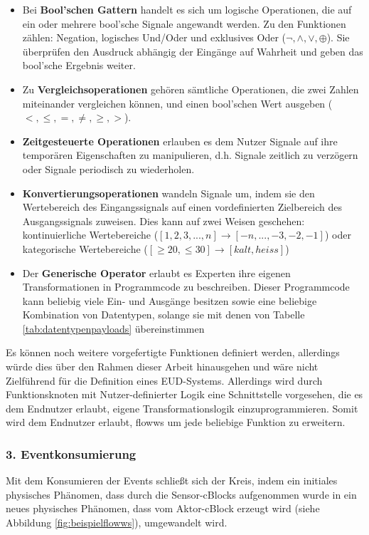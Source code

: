 \begin{itemize} 
     \item Bei \textbf{Bool'schen Gattern} handelt es sich um logische Operationen, die auf ein oder mehrere bool'sche Signale angewandt werden. Zu den Funktionen zählen: Negation, logisches Und/Oder und exklusives Oder ($\neg, \land, \lor, \oplus$). Sie überprüfen den Ausdruck abhängig der Eingänge auf Wahrheit und geben das bool'sche Ergebnis weiter.
     \item Zu \textbf{Vergleichsoperationen} gehören sämtliche Operationen, die zwei Zahlen miteinander vergleichen können, und einen bool'schen Wert ausgeben ($<,\leq,=,\neq,\geq,>$).
     \item \textbf{Zeitgesteuerte Operationen} erlauben es dem Nutzer Signale auf ihre temporären Eigenschaften zu manipulieren, d.h. Signale zeitlich zu verzögern oder Signale periodisch zu wiederholen.
     \item \textbf{Konvertierungsoperationen} wandeln Signale um, indem sie den Wertebereich des Eingangssignals auf einen vordefinierten Zielbereich des Ausgangssignals zuweisen. Dies kann auf zwei Weisen geschehen: kontinuierliche Wertebereiche ($\left [ 1,2,3,...,n \right ] \rightarrow \left [ -n,...,-3,-2,-1 \right ]$) oder kategorische Wertebereiche ($\left [ \geq20, \leq30  \right ] \rightarrow \left [ kalt,heiss \right ]$)
     \item Der \textbf{Generische Operator} erlaubt es Experten ihre eigenen Transformationen in Programmcode zu beschreiben. Dieser Programmcode kann beliebig viele Ein- und Ausgänge besitzen sowie eine beliebige Kombination von Datentypen, solange sie mit denen von Tabelle \ref{tab:datentypenpayloads} übereinstimmen
 \end{itemize}
 Es können noch weitere vorgefertigte Funktionen definiert werden, allerdings würde dies über den Rahmen dieser Arbeit hinausgehen und wäre nicht Zielführend für die Definition eines \ac{EUD}-Systems. Allerdings wird durch Funktionsknoten mit Nutzer-definierter Logik eine Schnittstelle vorgesehen, die es dem Endnutzer erlaubt, eigene Transformationslogik einzuprogrammieren. Somit wird dem Endnutzer erlaubt, flowws um jede beliebige Funktion zu erweitern.
 
\subsubsection{3. Eventkonsumierung} \label{subsubsec:evebtkonsumierung}
Mit dem Konsumieren der Events schließt sich der Kreis, indem ein initiales physisches Phänomen, dass durch die Sensor-cBlocks aufgenommen wurde in ein neues physisches Phänomen, dass vom Aktor-cBlock erzeugt wird (siehe Abbildung \ref{fig:beispielflowws}), umgewandelt wird. 

